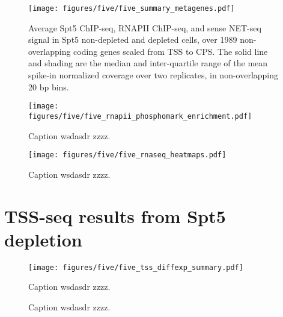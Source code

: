 \lipsum[1]

\begin{wrapfigure}[14]{r}{3in}
    \texttt{[image: figures/five/five\_summary\_metagenes.pdf]}
    \caption[Average Spt5 ChIP-seq, RNAPII ChIP-seq, and sense NET-seq signal over non-overlapping coding genes, from Spt5 depleted and non-depleted cells.]{Average Spt5 ChIP-seq, RNAPII ChIP-seq, and sense NET-seq signal in Spt5 non-depleted and depleted cells, over 1989 non-overlapping coding genes scaled from TSS to CPS. The solid line and shading are the median and inter-quartile range of the mean spike-in normalized coverage over two replicates, in non-overlapping 20 bp bins.}
    \label{fig:five_suummary_metagenes}
\end{wrapfigure}

\lipsum[2]

\begin{wrapfigure}[6]{r}{4.5in}
    \texttt{[image: figures/five/five\_rnapii\_phosphomark\_enrichment.pdf]}
    \caption[Enrichment of RNAPII phospho-serine 5 and phospho-serine 2 over non-overlapping coding genes, in Spt5 depleted and non-depleted cells.]{Caption wsdasdr zzzz.}
    \label{fig:five_rnapii_phosphomark_enrichment}
\end{wrapfigure}

\begin{figure}
    \texttt{[image: figures/five/five\_rnaseq\_heatmaps.pdf]}
    \caption[Heatmaps of antisense RNA-seq signal from Spt5 depleted and non-depleted cells, over non-overlapping coding genes.]{Caption wsdasdr zzzz.}
    \label{fig:five_rnaseq_heatmaps}
\end{figure}

\lipsum[2]

\section{TSS-seq results from Spt5 depletion}

\begin{wrapfigure}[6]{r}{3in}
    \texttt{[image: figures/five/five\_tss\_diffexp\_summary.pdf]}
    \caption[Bar plot of the number of TSS-seq peaks of various genomic classes differentially expressed in Spt5 depleted versus non-depleted cells.]{Caption wsdasdr zzzz.}
    \label{fig:five_tss_diffexp_summary}
\end{wrapfigure}

\lipsum[1]

\begin{figure}
\caption[Heatmaps of antisense TSS-seq, RNA-seq, and NET-seq signal from Spt5 depleted and non-depleted cells, over genes with Spt5-depletion-induced antisense TSSs.]{Caption wsdasdr zzzz.}
\end{figure}

